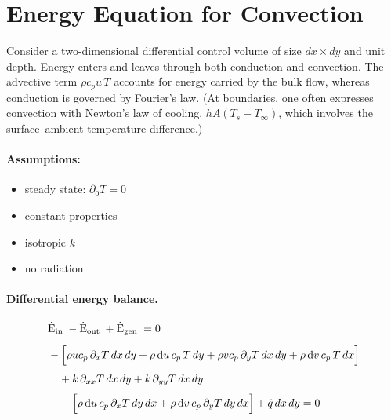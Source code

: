 \section*{Energy Equation for Convection}
\label{subsec:energy_viscous}

Consider a two-dimensional differential control volume of size \(dx \times dy\) and unit depth.  
Energy enters and leaves through both conduction and convection.  
The advective term \(\rho c_p u\,T\) accounts for energy carried by the bulk flow, whereas conduction is governed by Fourier’s law.  
(At boundaries, one often expresses convection with Newton’s law of cooling, \(hA\!\left(T_s - T_\infty\right)\), which involves the surface–ambient temperature difference.)
%
\begin{figure}[H]
    \centering
    
\end{figure}
%
\paragraph{Assumptions:}
\begin{itemize}
    \item steady state: $\partial_0 T = 0$
    \item constant properties 
    \item isotropic $k$
    \item no radiation
\end{itemize}
%
%
\paragraph{Differential energy balance.}
\[
    \begin{aligned}
    &
    \dot{\mathrm{E}}_{\text {in }}-\dot{\mathrm{E}}_{\text {out }}+\dot{\mathrm{E}}_{\text {gen }}=0
    \\[0.5em]
    &-\Bigl[
      \rho u c_p \,\partial_x T \,dx\,dy
      + \rho\,\mathrm{d}u\,c_p\,T\,dy
      + \rho v c_p \,\partial_y T \,dx\,dy
      + \rho\,\mathrm{d}v\,c_p\,T\,dx
    \Bigr]
    \\[0.3em]
    &\quad
    + k \,\partial_{xx} T \,dx\,dy
    + k \,\partial_{yy} T \,dx\,dy  
    \\[0.3em]
    &\quad
    -\Bigl[
      \rho\,\mathrm{d}u\,c_p\,\partial_x T \,dy\,dx
      + \rho\,\mathrm{d}v\,c_p\,\partial_y T \,dy\,dx
    \Bigr]
    + \dot{q}\,dx\,dy
    =0 
    \end{aligned}
\]
%
